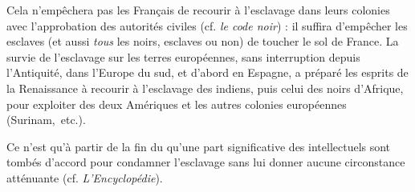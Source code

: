  Cela n'empêchera pas les Français de recourir à l'esclavage dans leurs colonies avec l'approbation des autorités civiles (cf. \emph{le code noir}) : il suffira d'empêcher les esclaves (et aussi \emph{tous} les noirs, esclaves ou non) de toucher le sol de France. La survie de l'esclavage sur les terres européennes, sans interruption depuis l'Antiquité, dans l'Europe du sud, et d'abord en Espagne, a préparé les esprits de la Renaissance à recourir  à l'esclavage des indiens, puis celui des noirs d'Afrique, pour exploiter des deux Amériques et les autres colonies européennes (Surinam,~etc.). 

 Ce n'est qu'à partir de la fin du  qu'une part significative des intellectuels sont tombés d'accord pour condamner l'esclavage sans lui donner aucune circonstance atténuante (cf. \emph{L'Encyclopédie}).
